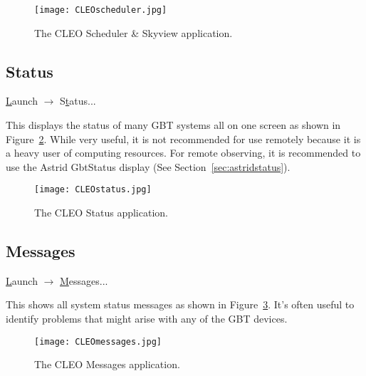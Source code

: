 \begin{figure}[!h]
\setlength{\abovecaptionskip}{0pt}\setlength{\belowcaptionskip}{0pt}
\begin{center}
\texttt{[image: CLEOscheduler.jpg]}
\caption[CLEO Scheduler \& Skyview]
{The \gls{CLEO} Scheduler \& Skyview application.
\label{fig:CLEOskyview}}
\end{center}
\end{figure}
\newpage

\subsection{Status}
{\btt \underline{L}aunch} $\rightarrow$ {\btt S\underline{t}atus...}

This displays the status of many \gls{GBT} systems all on one screen as shown in
Figure~\ref{fig:CLEOstatus}. While very useful, it is not recommended for use remotely because it 
is a heavy user of computing resources.  For remote observing, it is
recommended to use the Astrid GbtStatus display (See Section~\ref{sec:astridstatus}).

\begin{figure}[!h]
\begin{center}
\texttt{[image: CLEOstatus.jpg]}
\caption[CLEO Status]
{The \gls{CLEO} Status application.
\label{fig:CLEOstatus}}
\end{center}
\end{figure}

\vspace{-1cm}

\subsection{Messages}
{\btt \underline{L}aunch} $\rightarrow$ {\btt \underline{M}essages...}

This shows all system status messages as shown in Figure~\ref{fig:CLEOmessages}.
It's often useful to identify problems that might arise with any of the \gls{GBT} devices.

\begin{figure}[!h]
\begin{center}
\texttt{[image: CLEOmessages.jpg]}
\caption[CLEO Messages]
{The \gls{CLEO} Messages application.
\label{fig:CLEOmessages}}
\end{center}
\end{figure}




